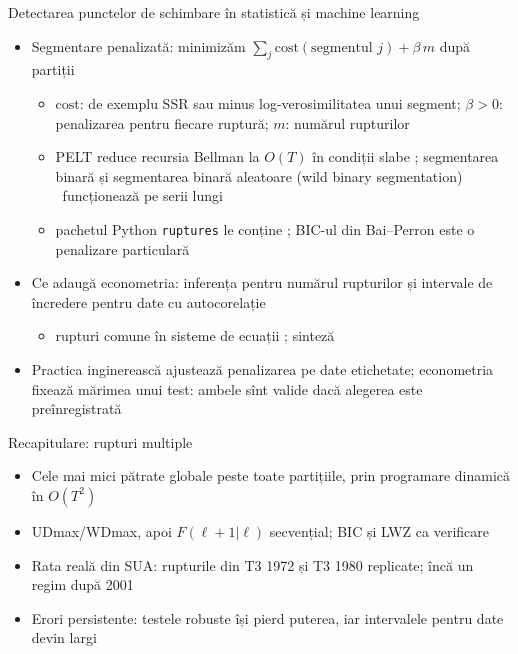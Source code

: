 \begin{frame}{Detectarea punctelor de schimbare în statistică și machine learning}
\itemsize{\small}
\begin{itemize}
    \item Segmentare penalizată: minimizăm $\sum_j \mathrm{cost}(\text{segmentul } j) + \beta\,m$ după partiții
    \begin{itemize}
        \item $\mathrm{cost}$: de exemplu SSR sau minus log-verosimilitatea unui segment; $\beta > 0$: penalizarea pentru fiecare ruptură; $m$: numărul rupturilor
        \item PELT reduce recursia Bellman la $O(T)$ în condiții slabe ; segmentarea binară și segmentarea binară aleatoare (wild binary segmentation) \ funcționează pe serii lungi
        \item pachetul Python \texttt{ruptures} le conține ; BIC-ul din Bai--Perron este o penalizare particulară
    \end{itemize}
    \item Ce adaugă econometria: inferența pentru numărul rupturilor și intervale de încredere pentru date cu autocorelație
    \begin{itemize}
        \item rupturi comune în sisteme de ecuații ; sinteză 
    \end{itemize}
    \item Practica inginerească ajustează penalizarea pe date etichetate; econometria fixează mărimea unui test: ambele sînt valide dacă alegerea este preînregistrată
\end{itemize}
\end{frame}

\begin{frame}{Recapitulare: rupturi multiple}
\itemsize{\small}
\begin{itemize}
    \item Cele mai mici pătrate globale peste toate partițiile, prin programare dinamică în $O(T^2)$
    \item UDmax/WDmax, apoi $F(\ell + 1|\ell)$ secvențial; BIC și LWZ ca verificare
    \item Rata reală din SUA: rupturile din T3 1972 și T3 1980 replicate; încă un regim după 2001
    \item Erori persistente: testele robuste își pierd puterea, iar intervalele pentru date devin largi
\end{itemize}
\end{frame}


